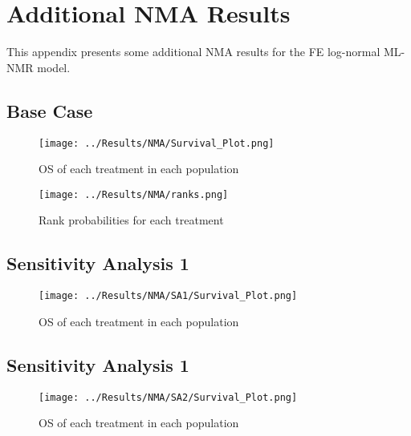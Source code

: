 \chapter{Additional NMA Results}\label{NMAAppendix}

This appendix presents some additional NMA results for the FE log-normal ML-NMR model. 

\section{Base Case}

\begin{figure}[h]
    \centering
    \texttt{[image: ../Results/NMA/Survival\_Plot.png]}
    \caption{OS of each treatment in each population}
    \label{fig:pred_survbc}
\end{figure}

\begin{figure}[h]
    \centering
    \texttt{[image: ../Results/NMA/ranks.png]}
    \caption{Rank probabilities for each treatment}
    \label{fig:rankplot}
\end{figure}

\clearpage
\section{Sensitivity Analysis 1}

\begin{figure}[h]
    \centering
    \texttt{[image: ../Results/NMA/SA1/Survival\_Plot.png]}
    \caption{OS of each treatment in each population}
    \label{fig:pred_survSA1}
\end{figure}

\clearpage
\section{Sensitivity Analysis 1}

\begin{figure}[h]
    \centering
    \texttt{[image: ../Results/NMA/SA2/Survival\_Plot.png]}
    \caption{OS of each treatment in each population}
    \label{fig:pred_survSA2}
\end{figure}
